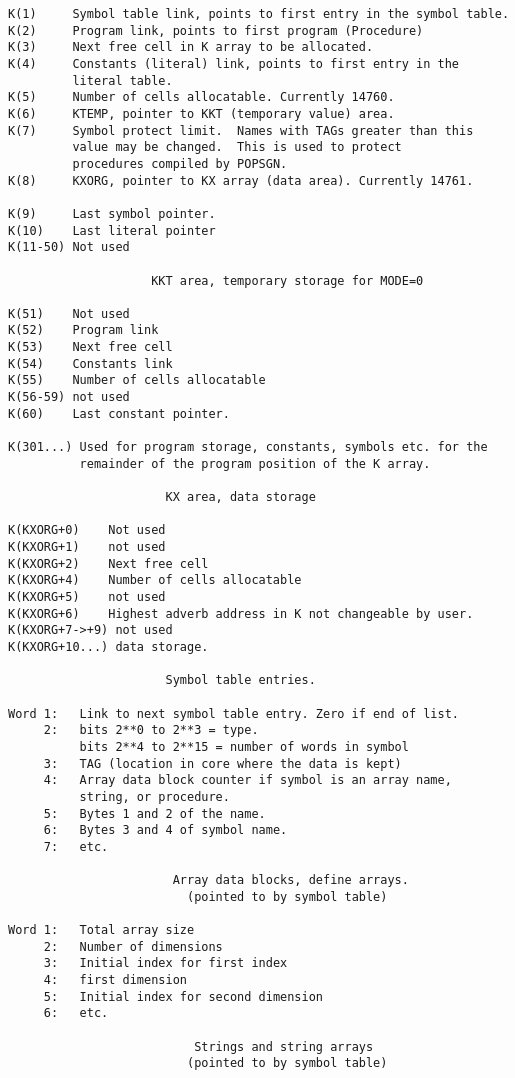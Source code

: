 \begin{verbatim}
K(1)     Symbol table link, points to first entry in the symbol table.
K(2)     Program link, points to first program (Procedure)
K(3)     Next free cell in K array to be allocated.
K(4)     Constants (literal) link, points to first entry in the
         literal table.
K(5)     Number of cells allocatable. Currently 14760.
K(6)     KTEMP, pointer to KKT (temporary value) area.
K(7)     Symbol protect limit.  Names with TAGs greater than this
         value may be changed.  This is used to protect
         procedures compiled by POPSGN.
K(8)     KXORG, pointer to KX array (data area). Currently 14761.

K(9)     Last symbol pointer.
K(10)    Last literal pointer
K(11-50) Not used

                    KKT area, temporary storage for MODE=0

K(51)    Not used
K(52)    Program link
K(53)    Next free cell
K(54)    Constants link
K(55)    Number of cells allocatable
K(56-59) not used
K(60)    Last constant pointer.

K(301...) Used for program storage, constants, symbols etc. for the
          remainder of the program position of the K array.

                      KX area, data storage

K(KXORG+0)    Not used
K(KXORG+1)    not used
K(KXORG+2)    Next free cell
K(KXORG+4)    Number of cells allocatable
K(KXORG+5)    not used
K(KXORG+6)    Highest adverb address in K not changeable by user.
K(KXORG+7->+9) not used
K(KXORG+10...) data storage.

                      Symbol table entries.

Word 1:   Link to next symbol table entry. Zero if end of list.
     2:   bits 2**0 to 2**3 = type.
          bits 2**4 to 2**15 = number of words in symbol
     3:   TAG (location in core where the data is kept)
     4:   Array data block counter if symbol is an array name,
          string, or procedure.
     5:   Bytes 1 and 2 of the name.
     6:   Bytes 3 and 4 of symbol name.
     7:   etc.

                       Array data blocks, define arrays.
                         (pointed to by symbol table)

Word 1:   Total array size
     2:   Number of dimensions
     3:   Initial index for first index
     4:   first dimension
     5:   Initial index for second dimension
     6:   etc.

                          Strings and string arrays
                         (pointed to by symbol table)


\end{verbatim}
